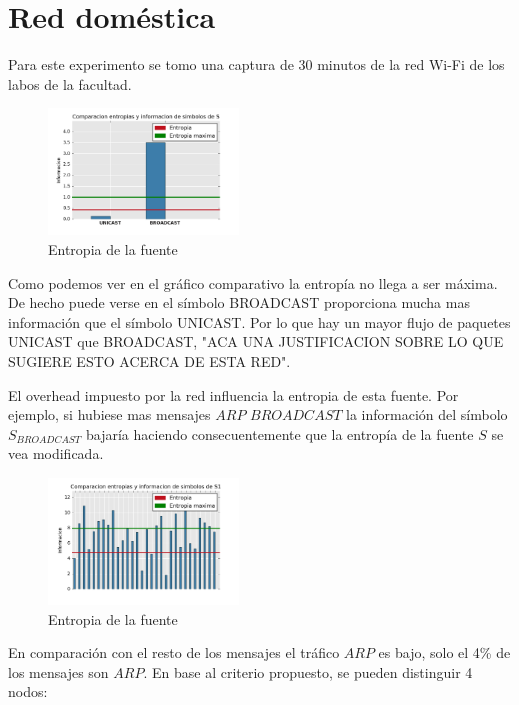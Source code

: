 \section{Red doméstica}

Para este experimento se tomo una captura de 30 minutos de la red Wi-Fi de los labos de la facultad.
\begin{figure}[h]
  \centering
    \includegraphics[width=0.45\textwidth]{grafico1-red-labos.png}
  \caption{Entropia de la fuente}
  \label{}
\end{figure}
Como podemos ver en el gráfico comparativo la entropía no llega a ser máxima. 
De hecho puede verse en el símbolo BROADCAST proporciona mucha mas información que el símbolo UNICAST. 
Por lo que hay un mayor flujo de paquetes UNICAST que BROADCAST, "ACA UNA JUSTIFICACION SOBRE LO QUE SUGIERE ESTO ACERCA DE ESTA RED". 

El overhead impuesto por la red influencia la entropia de esta fuente.
Por ejemplo, si hubiese mas mensajes $ARP$ $BROADCAST$ la información del símbolo $S_{BROADCAST}$ 
bajaría haciendo consecuentemente que la entropía de la fuente $S$ se vea modificada.

\begin{figure}[h]
  \centering
    \includegraphics[width=0.45\textwidth]{grafico2-red-labos.png}
  \caption{Entropia de la fuente}
  \label{}
\end{figure}

En comparación con el resto de los mensajes el tráfico $ARP$ es bajo, solo el 4\% de los mensajes son $ARP$. 
En base al criterio propuesto, se pueden distinguir 4 nodos:   

